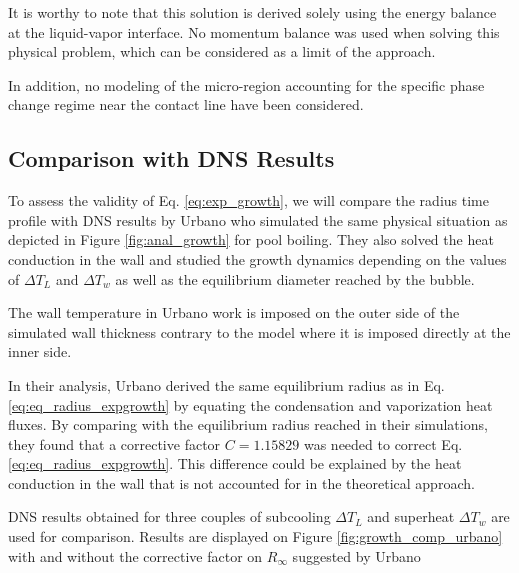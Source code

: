 \begin{remark*}{}
It is worthy to note that this solution is derived solely using the energy balance at the liquid-vapor interface. No momentum balance was used when solving this physical problem, which can be considered as a limit of the approach.

\npar

In addition, no modeling of the micro-region accounting for the specific phase change regime near the contact line have been considered.
\end{remark*}


\subsection{Comparison with DNS Results}

To assess the validity of Eq. \ref{eq:exp_growth}, we will compare the radius time profile with DNS results by Urbano \etal \cite{urbano_direct_2019} who simulated the same physical situation as depicted in Figure \ref{fig:anal_growth} for pool boiling. They also solved the heat conduction in the wall and studied the growth dynamics depending on the values of $\Delta T_{L}$ and $\Delta T_{w}$ as well as the equilibrium diameter reached by the bubble. 

\begin{note*}{}
The wall temperature in Urbano \etal \cite{urbano_direct_2019} work is imposed on the outer side of the simulated wall thickness contrary to the model where it is imposed directly at the inner side.
\end{note*}

\npar

In their analysis, Urbano \etal derived the same equilibrium radius as in Eq. \ref{eq:eq_radius_expgrowth} by equating the condensation and vaporization heat fluxes. By comparing with the equilibrium radius reached in their simulations, they found that a corrective factor $C=1.15829$ was needed to correct Eq. \ref{eq:eq_radius_expgrowth}. This difference could be explained by the heat conduction in the wall that is not accounted for in the theoretical approach.

\npar

DNS results obtained for three couples of subcooling $\Delta T_{L}$ and superheat $\Delta T_{w}$ are used for comparison. Results are displayed on Figure \ref{fig:growth_comp_urbano} with and without the corrective factor on $R_{\infty}$ suggested by Urbano \etal

